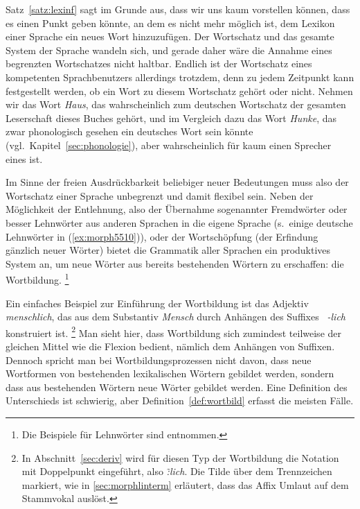 
Satz~\ref{satz:lexinf} sagt im Grunde aus, dass wir uns kaum vorstellen können, dass es einen Punkt geben könnte, an dem es nicht mehr möglich ist, dem Lexikon einer Sprache ein neues Wort hinzuzufügen.
Der Wortschatz und das gesamte System der Sprache wandeln sich, und gerade daher wäre die Annahme eines begrenzten Wortschatzes nicht haltbar.
Endlich ist der Wortschatz eines kompetenten Sprachbenutzers allerdings trotzdem, denn zu jedem Zeitpunkt kann festgestellt werden, ob ein Wort zu diesem Wortschatz gehört oder nicht.
Nehmen wir das Wort \textit{Haus}, das wahrscheinlich zum deutschen Wortschatz der gesamten Leserschaft dieses Buches gehört, und im Vergleich dazu das Wort \textit{Hunke}, das zwar phonologisch gesehen ein deutsches Wort sein könnte (vgl.\ Kapitel~\ref{sec:phonologie}), aber wahrscheinlich für kaum einen Sprecher eines ist.

Im Sinne der freien Ausdrückbarkeit beliebiger neuer Bedeutungen muss also der Wortschatz einer Sprache unbegrenzt und damit flexibel sein.
Neben der Möglichkeit der Entlehnung, also der Übernahme sogenannter Fremdwörter oder besser Lehnwörter aus anderen Sprachen in die eigene Sprache (s.\ einige deutsche Lehnwörter in (\ref{ex:morph5510})), oder der Wortschöpfung (der Erfindung gänzlich neuer Wörter) bietet die Grammatik aller Sprachen ein produktives System an, um neue Wörter aus bereits bestehenden Wörtern zu erschaffen: die Wortbildung.%
\footnote{Die Beispiele für Lehnwörter sind \citet{Kluge02} entnommen.}

\begin{exe}
  \ex \label{ex:morph5510}
  \begin{xlist}
  \end{xlist}
\end{exe}

Ein einfaches Beispiel zur Einführung der Wortbildung ist \zB das Adjektiv \textit{menschlich}, das aus dem Substantiv \textit{Mensch} durch Anhängen des Suffixes \textit{~-lich} konstruiert ist.%
\footnote{In Abschnitt~\ref{sec:deriv} wird für diesen Typ der Wortbildung die Notation mit Doppelpunkt eingeführt, also \textit{\~:lich}.
Die Tilde über dem Trennzeichen markiert, wie in \ref{sec:morphlinterm} erläutert, dass das Affix Umlaut auf dem Stammvokal auslöst.}
Man sieht hier, dass Wortbildung sich zumindest teilweise der gleichen Mittel wie die Flexion bedient, nämlich \zB dem Anhängen von Suffixen.
Dennoch spricht man bei Wortbildungsprozessen nicht davon, dass neue Wortformen von bestehenden lexikalischen Wörtern gebildet werden, sondern dass aus bestehenden Wörtern neue Wörter gebildet werden.
Eine Definition des Unterschieds ist schwierig, aber Definition~\ref{def:wortbild} erfasst die meisten Fälle.

